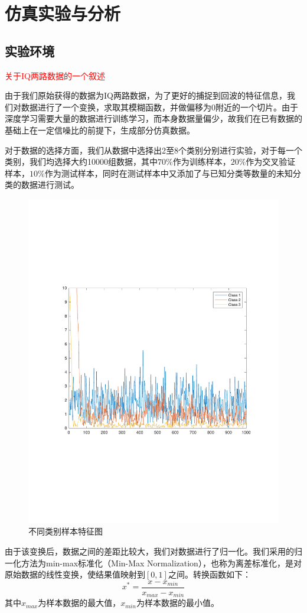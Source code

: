 \section{仿真实验与分析}
\subsection{实验环境}
\textcolor{red}{关于IQ两路数据的一个叙述}

由于我们原始获得的数据为IQ两路数据，为了更好的捕捉到回波的特征信息，我们对数据进行了一个变换，求取其模糊函数，并做偏移为0附近的一个切片。由于深度学习需要大量的数据进行训练学习，而本身数据量偏少，故我们在已有数据的基础上在一定信噪比的前提下，生成部分仿真数据。

对于数据的选择方面，我们从数据中选择出2至8个类别分别进行实验，对于每一个类别，我们均选择大约10000组数据，其中$70\%$作为训练样本，$20\%$作为交叉验证样本，$10\%$作为测试样本，同时在测试样本中又添加了与已知分类等数量的未知分类的数据进行测试。
\begin{figure}
	\centering
	\includegraphics[width=\textwidth]{figures/diff_data.pdf}
	\caption{不同类别样本特征图}
\end{figure}
由于该变换后，数据之间的差距比较大，我们对数据进行了归一化。我们采用的归一化方法为min-max标准化（Min-Max Normalization），也称为离差标准化，是对原始数据的线性变换，使结果值映射到$[0 , 1]$之间。转换函数如下：
\begin{equation}
x^{*}=\frac{x-x_{min}}{x_{max}-x_{min}}
\end{equation}
其中$x_{max}$为样本数据的最大值，$x_{min}$为样本数据的最小值。

